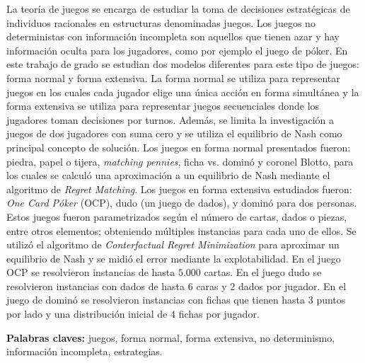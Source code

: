 \begin{resumen}

La teoría de juegos se encarga de estudiar la toma de decisiones estratégicas de individuos racionales en estructuras denominadas juegos. Los juegos no deterministas con información incompleta son aquellos que tienen azar y hay información oculta para los jugadores, como por ejemplo el juego de póker. En este trabajo de grado se estudian dos modelos diferentes para este tipo de juegos: forma normal y forma extensiva. La forma normal se utiliza para representar juegos en los cuales cada jugador elige una única acción en forma simultánea y la forma extensiva se utiliza para representar juegos secuenciales donde los jugadores toman decisiones por turnos. Además, se limita la investigación a juegos de dos jugadores con suma cero y se utiliza el equilibrio de Nash como principal concepto de solución. Los juegos en forma normal presentados fueron: piedra, papel o tijera, \textit{matching pennies}, ficha vs. dominó y coronel Blotto, para los cuales se calculó una aproximación a un equilibrio de Nash mediante el algoritmo de \textit{Regret Matching}. Los juegos en forma extensiva estudiados fueron: \textit{One Card Póker} (OCP), dudo (un juego de dados), y dominó para dos personas. Estos juegos fueron parametrizados según el número de cartas, dados o piezas, entre otros elementos; obteniendo múltiples instancias para cada uno de ellos. Se utilizó el algoritmo de \textit{Conterfactual Regret Minimization} para aproximar un equilibrio de Nash y se midió el error mediante la explotabilidad. En el juego OCP se resolvieron instancias de hasta $5.000$ cartas. En el juego dudo se resolvieron instancias con dados de hasta $6$ caras y $2$ dados por jugador. En el juego de dominó se resolvieron instancias con fichas que tienen hasta $3$ puntos por lado y una distribución inicial de $4$ fichas por jugador.

\vfill
\textbf{Palabras claves:} juegos, forma normal, forma extensiva, no determinismo, información incompleta, estrategias.
\end{resumen}